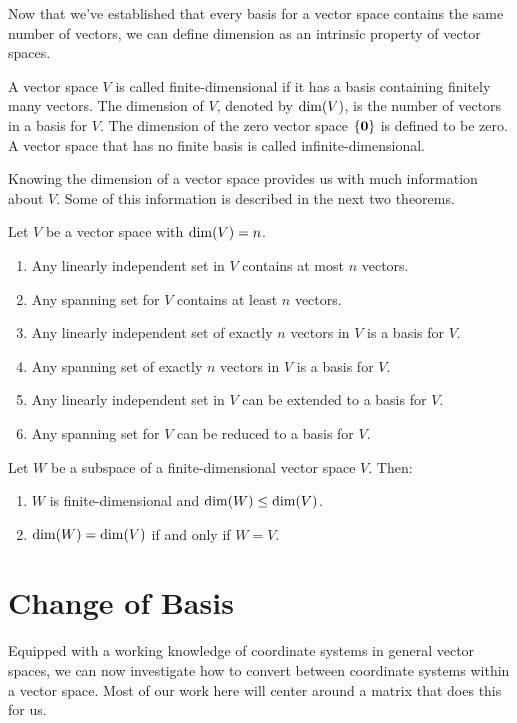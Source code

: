 \documentclass[../m073main.tex]{subfiles}
\begin{document}
Now that we've established that every basis for a vector space contains the same number of vectors, we can define dimension as an intrinsic property of vector spaces.

\begin{definition}[Dimension]
	A vector space $V$ is called finite-dimensional if it has a basis containing finitely many vectors.
	The dimension of $V$, denoted by $\operatorname{dim}(V)$, is the number of vectors in a basis for $V$.
	The dimension of the zero vector space $\{\mathbf{0}\}$ is defined to be zero.
	A vector space that has no finite basis is called infinite-dimensional.
\end{definition}

Knowing the dimension of a vector space provides us with much information about $V$.
Some of this information is described in the next two theorems.

\begin{theorem}
	Let $V$ be a vector space with $\operatorname{dim}(V) = n$.
	\begin{enumerate}[label=(\alph*)]
		\item Any linearly independent set in $V$ contains at most $n$ vectors.
		\item Any spanning set for $V$ contains at least $n$ vectors.
		\item Any linearly independent set of exactly $n$ vectors in $V$ is a basis for $V$.
		\item Any spanning set of exactly $n$ vectors in $V$ is a basis for $V$.
		\item Any linearly independent set in $V$ can be extended to a basis for $V$.
		\item Any spanning set for $V$ can be reduced to a basis for $V$.
	\end{enumerate}
\end{theorem}

\begin{theorem}
	Let $W$ be a subspace of a finite-dimensional vector space $V$.
	Then:
	\begin{enumerate}[label=(\alph*)]
		\item $W$ is finite-dimensional and $\operatorname{dim}(W) \leq \operatorname{dim}(V)$.
		\item $\operatorname{dim}(W) = \operatorname{dim}(V)$ if and only if $W = V$.
	\end{enumerate}
\end{theorem}

\section{Change of Basis}
Equipped with a working knowledge of coordinate systems in general vector spaces, we can now investigate how to convert between coordinate systems within a vector space.
Most of our work here will center around a matrix that does this for us.
\end{document}
